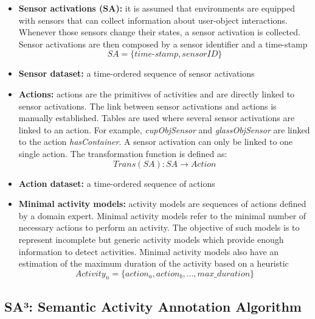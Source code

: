 \begin{itemize}
 \item \textbf{Sensor activations (SA):} it is assumed that environments are equipped with sensors that can collect information about user-object interactions. Whenever those sensors change their states, a sensor activation is collected. Sensor activations are then composed by a sensor identifier and a time-stamp
 \begin{equation*}
  SA = \{time\text{-}stamp, sensorID\}
 \end{equation*}
 \item \textbf{Sensor dataset:} a time-ordered sequence of sensor activations
 \item \textbf{Actions:} actions are the primitives of activities and are directly linked to sensor activations. The link between sensor activations and actions is manually established. Tables are used where several sensor activations are linked to an action. For example, \textit{cupObjSensor} and \textit{glassObjSensor} are linked to the action \textit{hasContainer}. A sensor activation can only be linked to one single action. The transformation function is defined as:
 \begin{equation*}
  Trans(SA) : SA \rightarrow Action
 \end{equation*}

 \item \textbf{Action dataset:} a time-ordered sequence of actions
 \item \textbf{Minimal activity models:} activity models are sequences of actions defined by a domain expert. Minimal activity models refer to the minimal number of necessary actions to perform an activity. The objective of such models is to represent incomplete but generic activity models which provide enough information to detect activities. Minimal activity models also have an estimation of the maximum duration of the activity based on a heuristic %
 \begin{equation*}
  Activity_n = \{action_a, action_b, \ldots , max\_duration\}
 \end{equation*}

\end{itemize}


\subsection{SA³: Semantic Activity Annotation Algorithm}

